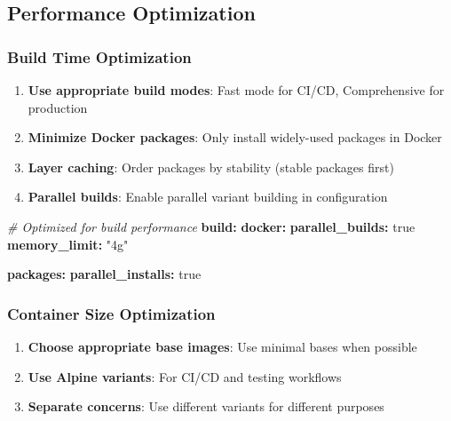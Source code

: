\documentclass[
]{article}
\newenvironment{Shaded}{\begin{snugshade}}{\end{snugshade}}
\newcommand{\AttributeTok}[1]{\textcolor[rgb]{0.13,0.29,0.53}{#1}}
\newcommand{\CharTok}[1]{\textcolor[rgb]{0.31,0.60,0.02}{#1}}
\newcommand{\CommentTok}[1]{\textcolor[rgb]{0.56,0.35,0.01}{\textit{#1}}}
\newcommand{\FunctionTok}[1]{\textcolor[rgb]{0.13,0.29,0.53}{\textbf{#1}}}
\newcommand{\KeywordTok}[1]{\textcolor[rgb]{0.13,0.29,0.53}{\textbf{#1}}}
\newcommand{\StringTok}[1]{\textcolor[rgb]{0.31,0.60,0.02}{#1}}
\providecommand{\tightlist}{%
  \setlength{\itemsep}{0pt}\setlength{\parskip}{0pt}}
\begin{document}
\subsection{Performance Optimization}\label{performance-optimization}

\subsubsection{Build Time Optimization}\label{build-time-optimization}

\begin{enumerate}
\def\labelenumi{\arabic{enumi}.}
\tightlist
\item
  \textbf{Use appropriate build modes}: Fast mode for CI/CD,
  Comprehensive for production
\item
  \textbf{Minimize Docker packages}: Only install widely-used packages
  in Docker
\item
  \textbf{Layer caching}: Order packages by stability (stable packages
  first)
\item
  \textbf{Parallel builds}: Enable parallel variant building in
  configuration
\end{enumerate}

\begin{Shaded}
\begin{Highlighting}[]
\CommentTok{\# Optimized for build performance}
\FunctionTok{build}\KeywordTok{:}
\AttributeTok{  }\FunctionTok{docker}\KeywordTok{:}
\AttributeTok{    }\FunctionTok{parallel\_builds}\KeywordTok{:}\AttributeTok{ }\CharTok{true}
\AttributeTok{    }\FunctionTok{memory\_limit}\KeywordTok{:}\AttributeTok{ }\StringTok{"4g"}

\AttributeTok{  }\FunctionTok{packages}\KeywordTok{:}
\AttributeTok{    }\FunctionTok{parallel\_installs}\KeywordTok{:}\AttributeTok{ }\CharTok{true}
\end{Highlighting}
\end{Shaded}

\subsubsection{Container Size
Optimization}\label{container-size-optimization}

\begin{enumerate}
\def\labelenumi{\arabic{enumi}.}
\tightlist
\item
  \textbf{Choose appropriate base images}: Use minimal bases when
  possible
\item
  \textbf{Use Alpine variants}: For CI/CD and testing workflows
\item
  \textbf{Separate concerns}: Use different variants for different
  purposes
\end{enumerate}
\end{document}
